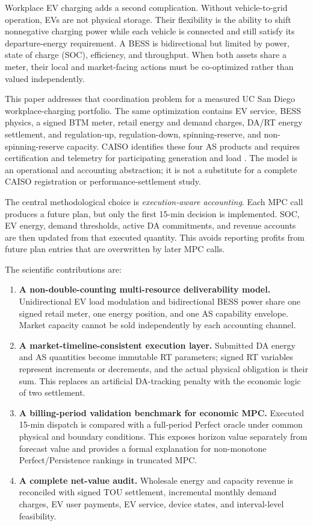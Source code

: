 \documentclass[final,5p,times]{elsarticle}
\begin{document}
Workplace EV charging adds a second complication. Without vehicle-to-grid operation, EVs are not physical storage. Their flexibility is the ability to shift nonnegative charging power while each vehicle is connected and still satisfy its departure-energy requirement. A BESS is bidirectional but limited by power, state of charge (SOC), efficiency, and throughput. When both assets share a meter, their local and market-facing actions must be co-optimized rather than valued independently.

This paper addresses that coordination problem for a measured UC San Diego workplace-charging portfolio. The same optimization contains EV service, BESS physics, a signed BTM meter, retail energy and demand charges, DA/RT energy settlement, and regulation-up, regulation-down, spinning-reserve, and non-spinning-reserve capacity. CAISO identifies these four AS products and requires certification and telemetry for participating generation and load \cite{caisoAncillary2026}. The model is an operational and accounting abstraction; it is not a substitute for a complete CAISO registration or performance-settlement study.

The central methodological choice is \emph{execution-aware accounting}. Each MPC call produces a future plan, but only the first 15-min decision is implemented. SOC, EV energy, demand thresholds, active DA commitments, and revenue accounts are then updated from that executed quantity. This avoids reporting profits from future plan entries that are overwritten by later MPC calls.

The scientific contributions are:
\begin{enumerate}
  \item \textbf{A non-double-counting multi-resource deliverability model.} Unidirectional EV load modulation and bidirectional BESS power share one signed retail meter, one energy position, and one AS capability envelope. Market capacity cannot be sold independently by each accounting channel.
  \item \textbf{A market-timeline-consistent execution layer.} Submitted DA energy and AS quantities become immutable RT parameters; signed RT variables represent increments or decrements, and the actual physical obligation is their sum. This replaces an artificial DA-tracking penalty with the economic logic of two settlement.
  \item \textbf{A billing-period validation benchmark for economic MPC.} Executed 15-min dispatch is compared with a full-period Perfect oracle under common physical and boundary conditions. This exposes horizon value separately from forecast value and provides a formal explanation for non-monotone Perfect/Persistence rankings in truncated MPC.
  \item \textbf{A complete net-value audit.} Wholesale energy and capacity revenue is reconciled with signed TOU settlement, incremental monthly demand charges, EV user payments, EV service, device states, and interval-level feasibility.
\end{enumerate}
\end{document}

